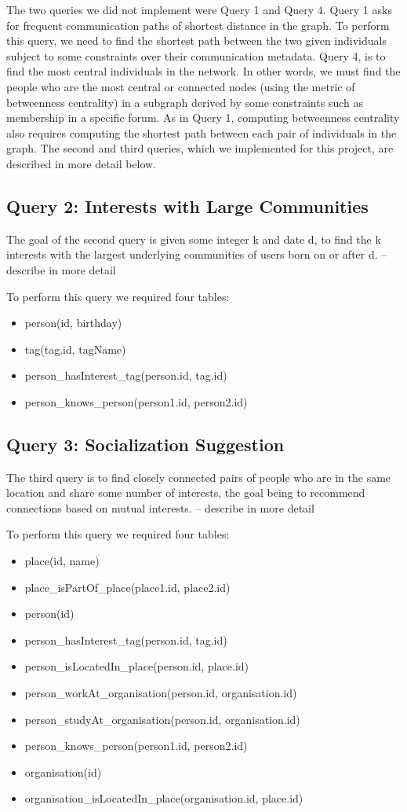 \documentclass{article}
\begin{document}
\begin{multicols}{2}
The two queries we did not implement were Query 1 and Query 4. Query 1 asks for frequent communication paths of shortest distance in the graph. To perform this query, we need to find the shortest path between the two given individuals subject to some constraints over their communication metadata. Query 4, is to find the most central individuals in the network. In other words, we must find the people who are the most central or connected nodes (using the metric of betweenness centrality) in a subgraph derived by some constraints such as membership in a specific forum. As in Query 1, computing betweenness centrality also requires computing the shortest path between each pair of individuals in the graph. The second and third queries, which we implemented for this project, are described in more detail below.

\subsection{Query 2: Interests with Large Communities}
The goal of the second query is given some integer k and date d, to find the k interests with the largest underlying communities of users born on or after d.
-- describe in more detail 

To perform this query we required four tables: 
\begin{itemize}
\item person(id, birthday)
\item tag(tag.id, tagName)
\item person\_hasInterest\_tag(person.id, tag.id)
\item person\_knows\_person(person1.id, person2.id)
\end{itemize}

\subsection{Query 3: Socialization Suggestion}
The third query is to find closely connected pairs of people who are in the same location and share some number of interests, the goal being to recommend connections based on mutual interests.
-- describe in more detail

To perform this query we required four tables: 
\begin{itemize}
\item place(id, name)
\item place\_isPartOf\_place(place1.id, place2.id)
\item person(id)
\item person\_hasInterest\_tag(person.id, tag.id)
\item person\_isLocatedIn\_place(person.id, place.id)
\item person\_workAt\_organisation(person.id, organisation.id)
\item person\_studyAt\_organisation(person.id, organisation.id)
\item person\_knows\_person(person1.id, person2.id)
\item organisation(id)
\item organisation\_isLocatedIn\_place(organisation.id, place.id)
\end{itemize}


\end{multicols}
\end{document}
